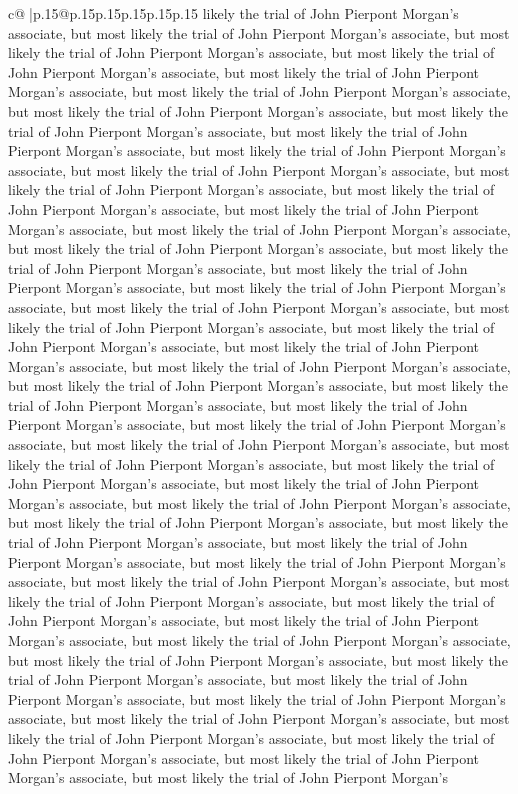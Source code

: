 \documentclass{article}
\begin{document}
{\begin{supertabular}{c@{$\;$}|p{.15\linewidth}@{}p{.15\linewidth}p{.15\linewidth}p{.15\linewidth}p{.15\linewidth}p{.15\linewidth}}
{{{likely the trial of John Pierpont Morgan's associate, but most likely the trial of John Pierpont Morgan's associate, but most likely the trial of John Pierpont Morgan's associate, but most likely the trial of John Pierpont Morgan's associate, but most likely the trial of John Pierpont Morgan's associate, but most likely the trial of John Pierpont Morgan's associate, but most likely the trial of John Pierpont Morgan's associate, but most likely the trial of John Pierpont Morgan's associate, but most likely the trial of John Pierpont Morgan's associate, but most likely the trial of John Pierpont Morgan's associate, but most likely the trial of John Pierpont Morgan's associate, but most likely the trial of John Pierpont Morgan's associate, but most likely the trial of John Pierpont Morgan's associate, but most likely the trial of John Pierpont Morgan's associate, but most likely the trial of John Pierpont Morgan's associate, but most likely the trial of John Pierpont Morgan's associate, but most likely the trial of John Pierpont Morgan's associate, but most likely the trial of John Pierpont Morgan's associate, but most likely the trial of John Pierpont Morgan's associate, but most likely the trial of John Pierpont Morgan's associate, but most likely the trial of John Pierpont Morgan's associate, but most likely the trial of John Pierpont Morgan's associate, but most likely the trial of John Pierpont Morgan's associate, but most likely the trial of John Pierpont Morgan's associate, but most likely the trial of John Pierpont Morgan's associate, but most likely the trial of John Pierpont Morgan's associate, but most likely the trial of John Pierpont Morgan's associate, but most likely the trial of John Pierpont Morgan's associate, but most likely the trial of John Pierpont Morgan's associate, but most likely the trial of John Pierpont Morgan's associate, but most likely the trial of John Pierpont Morgan's associate, but most likely the trial of John Pierpont Morgan's associate, but most likely the trial of John Pierpont Morgan's associate, but most likely the trial of John Pierpont Morgan's associate, but most likely the trial of John Pierpont Morgan's associate, but most likely the trial of John Pierpont Morgan's associate, but most likely the trial of John Pierpont Morgan's associate, but most likely the trial of John Pierpont Morgan's associate, but most likely the trial of John Pierpont Morgan's associate, but most likely the trial of John Pierpont Morgan's associate, but most likely the trial of John Pierpont Morgan's associate, but most likely the trial of John Pierpont Morgan's associate, but most likely the trial of John Pierpont Morgan's associate, but most likely the trial of John Pierpont Morgan's associate, but most likely the trial of John Pierpont Morgan's associate, but most likely the trial of John Pierpont Morgan's associate, but most likely the trial of John Pierpont Morgan's associate, but most likely the trial of John Pierpont Morgan's associate, but most likely the trial of John Pierpont Morgan's associate, but most likely the trial of John Pierpont Morgan's associate, but most likely the trial of John Pierpont Morgan's }}}
\end{supertabular}}
\end{document}
